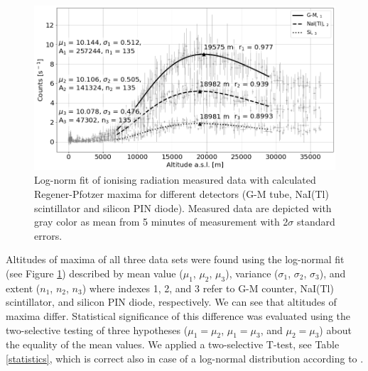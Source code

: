 \documentclass{Rpd}
\begin{document}
\begin{figure}
	\centerline{\includegraphics[width=\columnwidth]{img/FIK-6_R-P_maximum.png}}
	\caption{Log-norm fit of ionising radiation measured data with calculated Regener-Pfotzer maxima for different detectors (G-M tube, NaI(Tl) scintillator and silicon PIN diode). Measured data are depicted with gray color as mean from 5 minutes of measurement with 2$\sigma$ standard errors. \label{R-P_maximum}}
\end{figure}

Altitudes of maxima of all three data sets were found using the log-normal fit (see Figure \ref{R-P_maximum}) described by mean value ($\mu_1$, $\mu_2$, $\mu_3$), variance ($\sigma_1$, $\sigma_2$, $\sigma_3$), and extent ($n_1$, $n_2$, $n_3$) where indexes 1, 2, and 3 refer to G-M counter, NaI(Tl) scintillator, and silicon PIN diode, respectively. We can see that altitudes of maxima differ. Statistical significance of this difference was evaluated using the two-selective testing of three hypotheses ($\mu_1 = \mu_2$, $\mu_1 = \mu_3$, and $\mu_2 = \mu_3$) about the equality of the mean values. We applied a two-selective T-test, see Table \ref{statistics}, which is correct also in case of a log-normal distribution according to \cite{confidence_intervals}.
\end{document}
